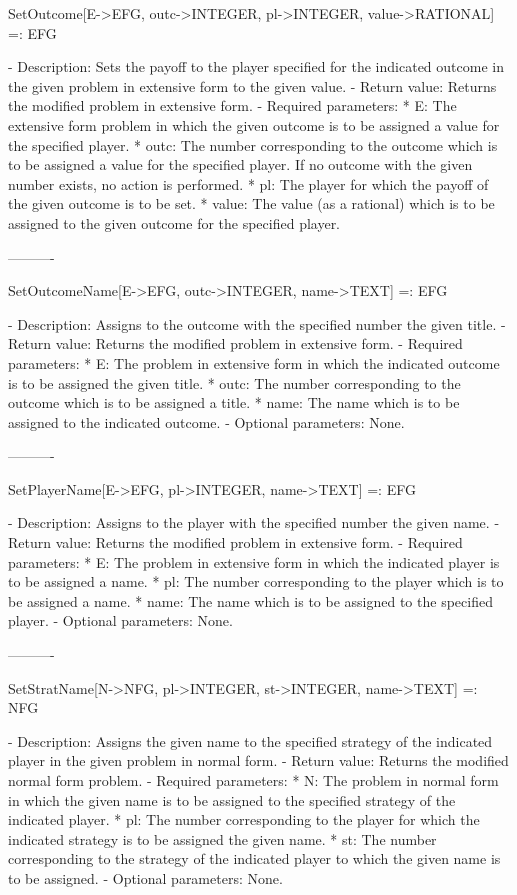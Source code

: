 SetOutcome[E->EFG, outc->INTEGER, pl->INTEGER, value->RATIONAL] =: EFG

   -	Description:  Sets the payoff to the player specified for the indicated
	outcome in the given problem in extensive form to the given value.
   -	Return value:  Returns the modified problem in extensive form.
   -	Required parameters:
	  *  E:  The extensive form problem in which the given outcome is to be
		assigned a value for the specified player.
	  *  outc:  The number corresponding to the outcome which is to be 
		assigned a value for the specified player.  If no outcome with
		 the given number exists, no action is performed.
	  *  pl:  The player for which the payoff of the given outcome is to be
		set.
	  *  value:  The value (as a rational) which is to be assigned to the 
		given outcome for the specified player.

----------

SetOutcomeName[E->EFG, outc->INTEGER, name->TEXT] =: EFG

   -	Description:  Assigns to the outcome with the specified number the 
	given title.
   -	Return value:  Returns the modified problem in extensive form.
   -	Required parameters:
	  *  E:  The problem in extensive form in which the indicated outcome 
		is to be assigned the given title.
	  *  outc:  The number corresponding to the outcome which is to be 
		assigned a title.
	  *  name:  The name which is to be assigned to the indicated outcome.
   -	Optional parameters:  None.

----------

SetPlayerName[E->EFG, pl->INTEGER, name->TEXT] =: EFG

   -	Description:  Assigns to the player with the specified number the given
	name.
   -	Return value:  Returns the modified problem in extensive form.
   -	Required parameters:
	  *  E:  The problem in extensive form in which the indicated player is
		to be assigned a name.
	  *  pl:  The number corresponding to the player which is to be 
		assigned a name.
	  *  name:  The name which is to be assigned to the specified player.
   -	Optional parameters:  None.

----------

SetStratName[N->NFG, pl->INTEGER, st->INTEGER, name->TEXT] =: NFG

   -	Description:  Assigns the given name to the specified strategy of the
	indicated player in the given problem in normal form.
   -	Return value:  Returns the modified normal form problem.
   -	Required parameters:
	  *  N:  The problem in normal form in which the given name is to be
		assigned to the specified strategy of the indicated player.
	  *  pl:  The number corresponding to the player for which the 
		indicated strategy is to be assigned the given name.
	  *  st:  The number corresponding to the strategy of the indicated 
		player to which the given name is to be assigned.
   -	Optional parameters:  None.

